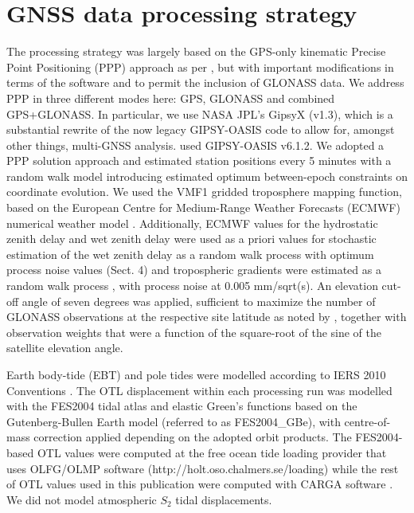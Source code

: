 \documentclass[se, manuscript]{copernicus}
\begin{document}
\section{GNSS data processing strategy}

The processing strategy was largely based on the GPS-only kinematic Precise Point Positioning (PPP) approach \citep{Zumberge1997} %
as per \cite{Penna2015}, but with important modifications in terms of the software and to permit the inclusion of GLONASS data. We address PPP in three different modes here: GPS, GLONASS and combined GPS+GLONASS. In particular, we use NASA JPL’s GipsyX (v1.3), which is a substantial rewrite of the now legacy GIPSY-OASIS code to allow for, amongst other things, multi-GNSS analysis. \cite{Penna2015} used GIPSY-OASIS v6.1.2.
We adopted a PPP solution approach and estimated station positions every 5 minutes with a random walk model introducing estimated optimum between-epoch constraints on coordinate evolution. We used the VMF1 gridded troposphere mapping function, based on the European Centre for Medium-Range Weather Forecasts (ECMWF) numerical weather model \citep{Boehm2006}. Additionally, ECMWF values for the hydrostatic zenith delay and wet zenith delay were used as a priori values for stochastic estimation of the wet zenith delay as a random walk process with optimum process noise values (Sect. 4) and tropospheric gradients were estimated as a random walk process \citep{Bar-Sever1998}, with process noise at 0.005 mm/sqrt(s). An elevation cut-off angle of seven degrees was applied, sufficient to maximize the number of GLONASS observations at the respective site latitude as noted by \cite{abbaszadeh_benefits_2020}, together with observation weights that were a function of the square-root of the sine of the satellite elevation angle.

Earth body-tide (EBT) and pole tides were modelled according to IERS 2010 Conventions \citep{IERS2010}. The OTL displacement within each processing run was modelled with the FES2004 tidal atlas \citep{Lyard2006} and elastic Green’s functions based on the Gutenberg-Bullen Earth model \citep{Farrell1972} (referred to as FES2004\_GBe), with centre-of-mass correction applied depending on the adopted orbit products. The FES2004-based OTL values were computed at the free ocean tide loading provider that uses OLFG/OLMP software (http://holt.oso.chalmers.se/loading) while the rest of OTL values used in this publication were computed with CARGA software \citep{bos_baker_2005}. We did not model atmospheric $S_2$ tidal displacements.
\end{document}
